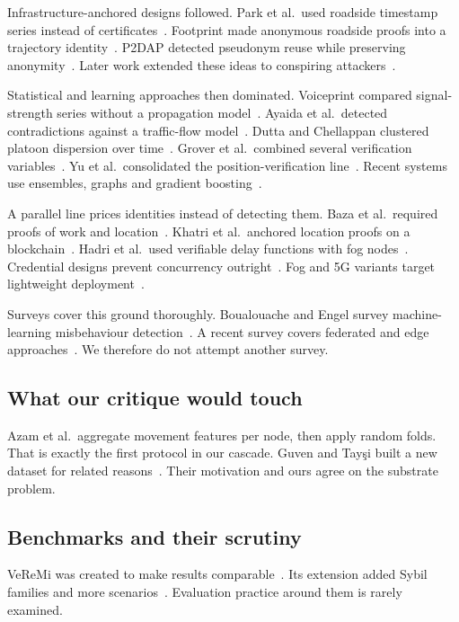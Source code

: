 \documentclass[journal,twoside]{IEEEtran}
\begin{document}
Infrastructure-anchored designs followed.
Park et al.\ used roadside timestamp series instead of certificates~\cite{park2009}.
Footprint made anonymous roadside proofs into a trajectory identity~\cite{chang2011}.
P2DAP detected pseudonym reuse while preserving anonymity~\cite{zhou2007,zhou2011}.
Later work extended these ideas to conspiring attackers~\cite{feng2016}.

Statistical and learning approaches then dominated.
Voiceprint compared signal-strength series without a propagation model~\cite{yao2017}.
Ayaida et al.\ detected contradictions against a traffic-flow model~\cite{ayaida2019}.
Dutta and Chellappan clustered platoon dispersion over time~\cite{dutta2013}.
Grover et al.\ combined several verification variables~\cite{grover2015}.
Yu et al.\ consolidated the position-verification line~\cite{yu2013}.
Recent systems use ensembles, graphs and gradient boosting~\cite{azam2022,sefati2025}.

A parallel line prices identities instead of detecting them.
Baza et al.\ required proofs of work and location~\cite{baza2020}.
Khatri et al.\ anchored location proofs on a blockchain~\cite{khatri2024}.
Hadri et al.\ used verifiable delay functions with fog nodes~\cite{hadri2026}.
Credential designs prevent concurrency outright~\cite{funderburg2021,akil2023}.
Fog and 5G variants target lightweight deployment~\cite{almazroi2024}.

Surveys cover this ground thoroughly.
Boualouache and Engel survey machine-learning misbehaviour detection~\cite{boualouache2023}.
A recent survey covers federated and edge approaches~\cite{tits2025survey}.
We therefore do not attempt another survey.

\subsection{What our critique would touch}



Azam et al.\ aggregate movement features per node, then apply random folds.
That is exactly the first protocol in our cascade.
Guven and Tay\c{s}i built a new dataset for related reasons~\cite{guven2024}.
Their motivation and ours agree on the substrate problem.

\subsection{Benchmarks and their scrutiny}

VeReMi was created to make results comparable~\cite{heijden2018}.
Its extension added Sybil families and more scenarios~\cite{kamel2020}.
Evaluation practice around them is rarely examined.
\end{document}
